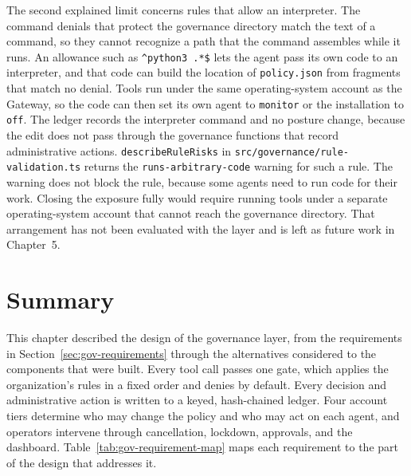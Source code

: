 The second explained limit concerns rules that allow an interpreter. The
command denials that protect the governance directory match the text of a
command, so they cannot recognize a path that the command assembles while
it runs. An allowance such as \texttt{\textasciicircum python3 .*\$} lets the agent pass
its own code to an interpreter, and that code can build the location of
\texttt{policy.json} from fragments that match no denial. Tools run under
the same operating-system account as the Gateway, so the code can then set
its own agent to \texttt{monitor} or the installation to \texttt{off}. The
ledger records the interpreter command and no posture change, because the
edit does not pass through the governance functions that record
administrative actions. \texttt{describeRuleRisks} in
\texttt{src/governance/rule-validation.ts} returns the
\texttt{runs-arbitrary-code} warning for such a rule. The warning does not
block the rule, because some agents need to run code for their work.
Closing the exposure fully would require running tools under a separate
operating-system account that cannot reach the governance directory. That
arrangement has not been evaluated with the layer and is left as future
work in Chapter~5.

\FloatBarrier
\section{Summary}
\label{sec:gov-designsummary}

This chapter described the design of the governance layer, from the
requirements in Section~\ref{sec:gov-requirements} through the
alternatives considered to the components that were built. Every tool call
passes one gate, which applies the organization's rules in a fixed order
and denies by default. Every decision and administrative action is written
to a keyed, hash-chained ledger. Four account tiers determine who may change
the policy and who may act on each agent, and operators intervene through
cancellation, lockdown, approvals, and the dashboard.
Table~\ref{tab:gov-requirement-map} maps each requirement to the part of
the design that addresses it.

